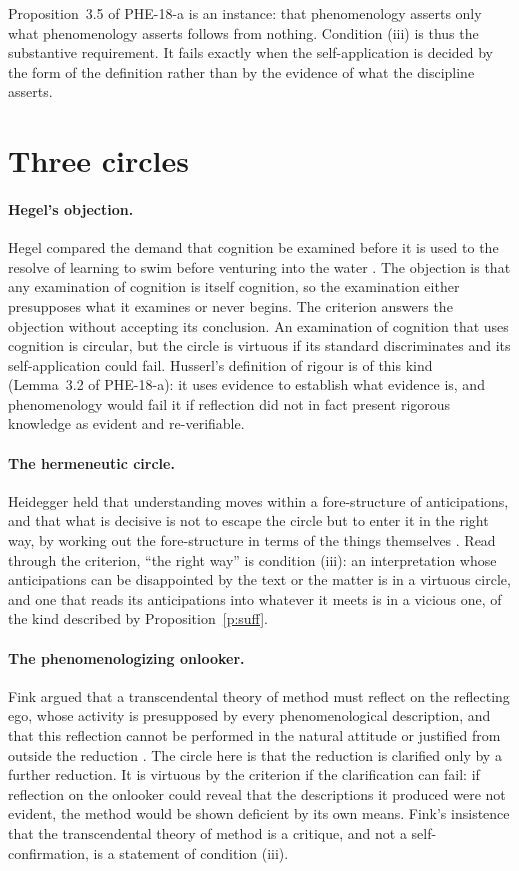 \documentclass{situationist-preprint}
\begin{document}
Proposition~3.5 of PHE-18-a is an instance: that phenomenology asserts only what phenomenology asserts follows from nothing. Condition (iii) is thus the substantive requirement. It fails exactly when the self-application is decided by the form of the definition rather than by the evidence of what the discipline asserts.

\section{Three circles}

\paragraph{Hegel's objection.} Hegel compared the demand that cognition be examined before it is used to the resolve of learning to swim before venturing into the water \citep[§10]{Hegel1830}. The objection is that any examination of cognition is itself cognition, so the examination either presupposes what it examines or never begins. The criterion answers the objection without accepting its conclusion. An examination of cognition that uses cognition is circular, but the circle is virtuous if its standard discriminates and its self-application could fail. Husserl's definition of rigour is of this kind (Lemma~3.2 of PHE-18-a): it uses evidence to establish what evidence is, and phenomenology would fail it if reflection did not in fact present rigorous knowledge as evident and re-verifiable.

\paragraph{The hermeneutic circle.} Heidegger held that understanding moves within a fore-structure of anticipations, and that what is decisive is not to escape the circle but to enter it in the right way, by working out the fore-structure in terms of the things themselves \citep[§32]{Heidegger1927}. Read through the criterion, \enquote{the right way} is condition (iii): an interpretation whose anticipations can be disappointed by the text or the matter is in a virtuous circle, and one that reads its anticipations into whatever it meets is in a vicious one, of the kind described by Proposition~\ref{p:suff}.

\paragraph{The phenomenologizing onlooker.} Fink argued that a transcendental theory of method must reflect on the reflecting ego, whose activity is presupposed by every phenomenological description, and that this reflection cannot be performed in the natural attitude or justified from outside the reduction \citep{Fink1995}. The circle here is that the reduction is clarified only by a further reduction. It is virtuous by the criterion if the clarification can fail: if reflection on the onlooker could reveal that the descriptions it produced were not evident, the method would be shown deficient by its own means. Fink's insistence that the transcendental theory of method is a critique, and not a self-confirmation, is a statement of condition (iii).
\end{document}
